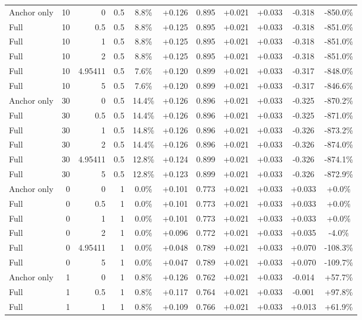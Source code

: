 \begin{table}[htbp]
\begin{tabular}{lrrrccccccc}
Anchor only & 10 & 0 & 0.5 & 8.8\% & +0.126 & 0.895 & +0.021 & +0.033 & -0.318 & -850.0\% \\
Full & 10 & 0.5 & 0.5 & 8.8\% & +0.125 & 0.895 & +0.021 & +0.033 & -0.318 & -851.0\% \\
Full & 10 & 1 & 0.5 & 8.8\% & +0.125 & 0.895 & +0.021 & +0.033 & -0.318 & -851.0\% \\
Full & 10 & 2 & 0.5 & 8.8\% & +0.125 & 0.895 & +0.021 & +0.033 & -0.318 & -851.0\% \\
Full & 10 & 4.95411 & 0.5 & 7.6\% & +0.120 & 0.899 & +0.021 & +0.033 & -0.317 & -848.0\% \\
Full & 10 & 5 & 0.5 & 7.6\% & +0.120 & 0.899 & +0.021 & +0.033 & -0.317 & -846.6\% \\
Anchor only & 30 & 0 & 0.5 & 14.4\% & +0.126 & 0.896 & +0.021 & +0.033 & -0.325 & -870.2\% \\
Full & 30 & 0.5 & 0.5 & 14.4\% & +0.126 & 0.896 & +0.021 & +0.033 & -0.325 & -871.0\% \\
Full & 30 & 1 & 0.5 & 14.8\% & +0.126 & 0.896 & +0.021 & +0.033 & -0.326 & -873.2\% \\
Full & 30 & 2 & 0.5 & 14.4\% & +0.126 & 0.896 & +0.021 & +0.033 & -0.326 & -874.0\% \\
Full & 30 & 4.95411 & 0.5 & 12.8\% & +0.124 & 0.899 & +0.021 & +0.033 & -0.326 & -874.1\% \\
Full & 30 & 5 & 0.5 & 12.8\% & +0.123 & 0.899 & +0.021 & +0.033 & -0.326 & -872.9\% \\
Anchor only & 0 & 0 & 1 & 0.0\% & +0.101 & 0.773 & +0.021 & +0.033 & +0.033 & +0.0\% \\
Full & 0 & 0.5 & 1 & 0.0\% & +0.101 & 0.773 & +0.021 & +0.033 & +0.033 & +0.0\% \\
Full & 0 & 1 & 1 & 0.0\% & +0.101 & 0.773 & +0.021 & +0.033 & +0.033 & +0.0\% \\
Full & 0 & 2 & 1 & 0.0\% & +0.096 & 0.772 & +0.021 & +0.033 & +0.035 & -4.0\% \\
Full & 0 & 4.95411 & 1 & 0.0\% & +0.048 & 0.789 & +0.021 & +0.033 & +0.070 & -108.3\% \\
Full & 0 & 5 & 1 & 0.0\% & +0.047 & 0.789 & +0.021 & +0.033 & +0.070 & -109.7\% \\
Anchor only & 1 & 0 & 1 & 0.8\% & +0.126 & 0.762 & +0.021 & +0.033 & -0.014 & +57.7\% \\
Full & 1 & 0.5 & 1 & 0.8\% & +0.117 & 0.764 & +0.021 & +0.033 & -0.001 & +97.8\% \\
Full & 1 & 1 & 1 & 0.8\% & +0.109 & 0.766 & +0.021 & +0.033 & +0.013 & +61.9\% \\

\end{tabular}
\end{table}
